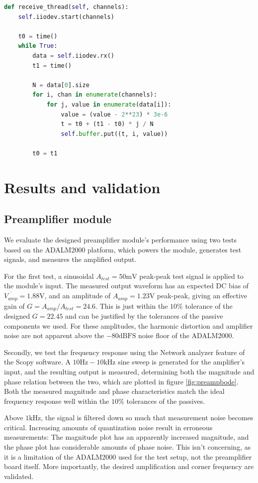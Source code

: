 \documentclass{thesis}
\newcommand{\V}{\unit{\volt}}
\newcommand{\mV}{\unit{\milli\volt}}
\newcommand{\Hz}{\unit{\hertz}}
\newcommand{\kHz}{\unit{\kilo\hertz}}
\newcommand{\dB}{\unit{\deci\bel}}
\begin{document}
\begin{lstlisting}[language=Python]
def receive_thread(self, channels):
    self.iiodev.start(channels)

    t0 = time()
    while True:
        data = self.iiodev.rx()
        t1 = time()
        
        N = data[0].size
        for i, chan in enumerate(channels):
            for j, value in enumerate(data[i]):
                value = (value - 2**23) * 3e-6
                t = t0 + (t1 - t0) * j / N
                self.buffer.put((t, i, value))

        t0 = t1
\end{lstlisting}

\newpage
\section{Results and validation}

\subsection*{Preamplifier module}

We evaluate the designed preamplifier module's performance using two tests based on the ADALM2000 platform, which powers the module, generates test signals, and measures the amplified output.

For the first test, a sinusoidal $A_{test} = 50\mV$ peak-peak test signal is applied to the module's input. The measured output waveform has an expected DC bias of $\overbar{V_{amp}}=1.88\V$, and an amplitude of $A_{amp}=1.23\V$ peak-peak, giving an effective gain of $G = A_{amp} / A_{test} = 24.6$. This is just within the $10\%$ tolerance of the designed $G=22.45$ and can be justified by the tolerances of the passive components we used. For these amplitudes, the harmonic distortion and amplifier noise are not apparent above the $-80\dB\text{FS}$ noise floor of the ADALM2000.

Secondly, we test the frequency response using the Network analyzer feature of the Scopy software\cite{scopy}. A $10\Hz - 10\kHz$ sine sweep is generated for the amplifier's input, and the resulting output is measured, determining both the magnitude and phase relation between the two, which are plotted in figure \ref{fig:preampbode}. Both the measured magnitude and phase characteristics match the ideal frequency response well within the $10\%$ tolerances of the passives.

Above $1\kHz$, the signal is filtered down so much that measurement noise becomes critical. Increasing amounts of quantization noise result in erroneous measurements: The magnitude plot has an apparently increased magnitude, and the phase plot has considerable amounts of phase noise. This isn't concerning, as it is a limitation of the ADALM2000 used for the test setup, not the preamplifier board itself. More importantly, the desired amplification and corner frequency are validated.
\end{document}
